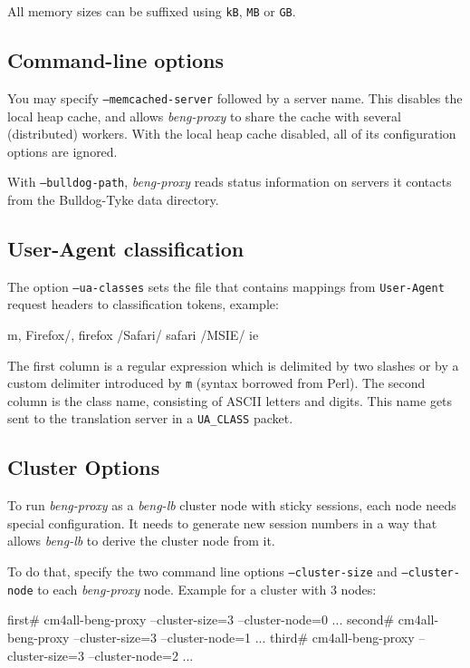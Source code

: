 \documentclass[a4paper,12pt]{article}
\begin{document}
All memory sizes can be suffixed using \texttt{kB}, \texttt{MB} or
\texttt{GB}.

\subsection{Command-line options}

\label{memcached}
You may specify \texttt{--memcached-server} followed by a server name.
This disables the local heap cache, and allows \emph{beng-proxy} to
share the cache with several (distributed) workers.  With the local
heap cache disabled, all of its configuration options are ignored.

\label{bulldog}
With \texttt{--bulldog-path}, \emph{beng-proxy} reads status
information on servers it contacts from the Bulldog-Tyke data
directory.

\subsection{User-Agent classification}
\label{uaclass}

The option \texttt{--ua-classes} sets the file that contains mappings
from \texttt{User-Agent} request headers to classification tokens,
example:

\begin{verbatim*}
m, Firefox/, firefox
/Safari/ safari
/MSIE/ ie
\end{verbatim*}

The first column is a regular expression which is delimited by two
slashes or by a custom delimiter introduced by \texttt{m} (syntax
borrowed from Perl).  The second column is the class name, consisting
of ASCII letters and digits.  This name gets sent to the translation
server in a \verb|UA_CLASS| packet.

\subsection{Cluster Options}

To run \emph{beng-proxy} as a \emph{beng-lb} cluster node with sticky
sessions, each node needs special configuration.  It needs to generate
new session numbers in a way that allows \emph{beng-lb} to derive the
cluster node from it.

To do that, specify the two command line options
\texttt{--cluster-size} and \texttt{--cluster-node} to each
\emph{beng-proxy} node.  Example for a cluster with 3 nodes:

\begin{verbatim*}
first# cm4all-beng-proxy --cluster-size=3 --cluster-node=0 ...
second# cm4all-beng-proxy --cluster-size=3 --cluster-node=1 ...
third# cm4all-beng-proxy --cluster-size=3 --cluster-node=2 ...
\end{verbatim*}
\end{document}
